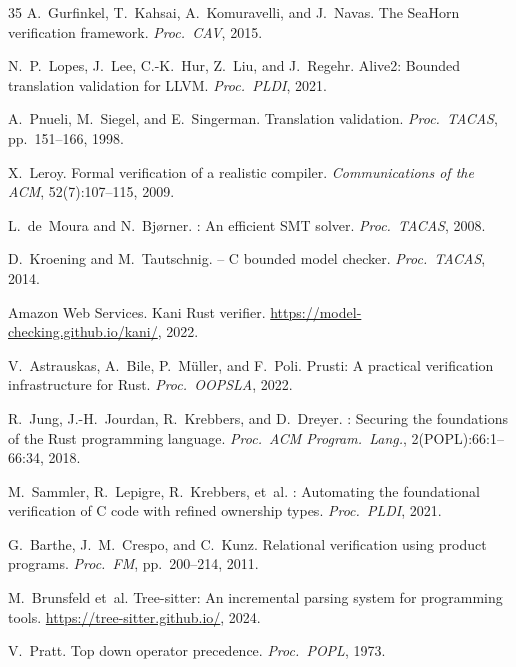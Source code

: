 \documentclass[10pt,a4paper]{article}
\begin{document}
\begin{thebibliography}{35}
A.~Gurfinkel, T.~Kahsai, A.~Komuravelli, and J.~Navas.
\newblock The {SeaHorn} verification framework.
\newblock \emph{Proc.\ CAV}, 2015.

N.~P.~Lopes, J.~Lee, C.-K.~Hur, Z.~Liu, and J.~Regehr.
\newblock Alive2: Bounded translation validation for {LLVM}.
\newblock \emph{Proc.\ PLDI}, 2021.

A.~Pnueli, M.~Siegel, and E.~Singerman.
\newblock Translation validation.
\newblock \emph{Proc.\ TACAS}, pp.\ 151--166, 1998.

X.~Leroy.
\newblock Formal verification of a realistic compiler.
\newblock \emph{Communications of the ACM}, 52(7):107--115, 2009.

L.~de~Moura and N.~Bj{\o}rner.
: An efficient {SMT} solver.
\newblock \emph{Proc.\ TACAS}, 2008.

D.~Kroening and M.~Tautschnig.
 -- {C} bounded model checker.
\newblock \emph{Proc.\ TACAS}, 2014.

Amazon Web Services.
\newblock Kani {Rust} verifier.
\newblock \url{https://model-checking.github.io/kani/}, 2022.

V.~Astrauskas, A.~Bi\-le, P.~M\"uller, and F.~Poli.
\newblock Prusti: A practical verification infrastructure for {Rust}.
\newblock \emph{Proc.\ OOPSLA}, 2022.

R.~Jung, J.-H.~Jourdan, R.~Krebbers, and D.~Dreyer.
: Securing the foundations of the {Rust} programming language.
\newblock \emph{Proc.\ ACM Program.\ Lang.}, 2(POPL):66:1--66:34, 2018.

M.~Sammler, R.~Lepigre, R.~Krebbers, et~al.
: Automating the foundational verification of {C} code with refined ownership types.
\newblock \emph{Proc.\ PLDI}, 2021.

G.~Barthe, J.~M.~Crespo, and C.~Kunz.
\newblock Relational verification using product programs.
\newblock \emph{Proc.\ FM}, pp.\ 200--214, 2011.

M.~Brunsfeld et~al.
\newblock Tree-sitter: An incremental parsing system for programming tools.
\newblock \url{https://tree-sitter.github.io/}, 2024.

V.~Pratt.
\newblock Top down operator precedence.
\newblock \emph{Proc.\ POPL}, 1973.


\end{thebibliography}
\end{document}
